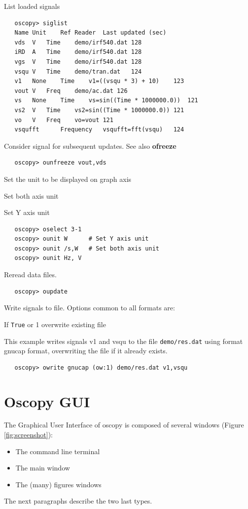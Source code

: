 \documentclass[a4paper,11pt]{report}
\renewenvironment{description}{%
\begin{basedescript}{%
\renewcommand{\makelabel}[1]{\bfseries##1}%
}%
}{%
\end{basedescript}%
}
\begin{document}
   List loaded signals
\begin{lstlisting}
   oscopy> siglist
   Name	Unit	Ref	Reader	Last updated (sec)
   vds	V	Time	demo/irf540.dat	128
   iRD	A	Time	demo/irf540.dat	128
   vgs	V	Time	demo/irf540.dat	128
   vsqu	V	Time	demo/tran.dat	124
   v1	None	Time	v1=((vsqu * 3) + 10)	123
   vout	V	Freq	demo/ac.dat	126
   vs	None	Time	vs=sin((Time * 1000000.0))	121
   vs2	V	Time	vs2=sin((Time * 1000000.0))	121
   vo	V	Freq	vo=vout	121
   vsqufft		Frequency	vsqufft=fft(vsqu)	124
\end{lstlisting}

   Consider signal for subsequent updates. See also \textbf{ofreeze}
\begin{lstlisting}
   oscopy> ounfreeze vout,vds
\end{lstlisting}

   Set the unit to be displayed on graph axis
   \begin{description}
   \item[ounit XUNIT, YUNIT] Set both axis unit
   \item[ounit YUNIT] Set Y axis unit
   \end{description}

\begin{lstlisting}
   oscopy> oselect 3-1
   oscopy> ounit W      # Set Y axis unit
   oscopy> ounit /s,W   # Set both axis unit
   oscopy> ounit Hz, V
\end{lstlisting}

   Reread data files.

\begin{lstlisting}
   oscopy> oupdate
\end{lstlisting}

   Write signals to file.
Options common to all formats are:
\begin{description}
\item[ow] If \texttt{True} or 1 overwrite existing file
\end{description}

\noindent This example writes signals v1 and vsqu to the file \texttt{demo/res.dat} using format gnucap format,
   overwriting the file if it already exists.
\begin{lstlisting}
   oscopy> owrite gnucap (ow:1) demo/res.dat v1,vsqu
\end{lstlisting}
\newpage
\chapter{Oscopy GUI}
The Graphical User Interface of oscopy is composed of several windows (Figure \ref{fig:screenshot}):
\begin{itemize}
\item The command line terminal
\item The main window
\item The (many) figures windows
\end{itemize}
The next paragraphs describe the two last types.
\end{document}

